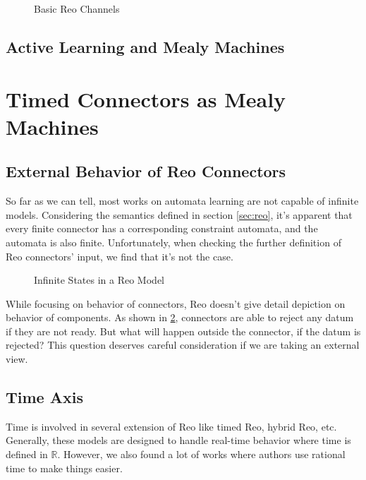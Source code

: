 \documentclass[conference, a4paper]{IEEEtran}
\begin{document}
\begin{figure}[h]
  \begin{center}
    
  \end{center}
  \caption{Basic Reo Channels}
  \label{fig:basic}
\end{figure}

\subsection{Active Learning and Mealy Machines}

\section{Timed Connectors as Mealy Machines}

\subsection{External Behavior of Reo Connectors}
So far as we can tell, most
works\cite{DBLP:conf/fase/RaffeltS06, DBLP:journals/corr/ChenHLLTWW15} on automata learning are not
capable of infinite models.  Considering the semantics defined in section
\ref{sec:reo}, it's apparent that every finite connector has a corresponding constraint
automata, and the automata is also finite. Unfortunately, when checking the further definition of
Reo connectors' input, we find that it's not the case.


\begin{figure}[h]
  \caption{Infinite States in a Reo Model}
  \label{fig:reoinfinite}
\end{figure}

While focusing on behavior of connectors, Reo doesn't give detail depiction on behavior of
components. As shown in \figurename \ref{fig:reoinfinite}, connectors are able to reject any datum
if they are not ready. But what will happen outside the connector, if the datum is rejected? This
question deserves careful consideration if we are taking an external view.

\subsection{Time Axis}
Time is involved in several extension of Reo like timed Reo, hybrid Reo, etc.
Generally, these models are designed to handle real-time behavior where time is defined in
$\mathbb{R}$. However, we also found a lot of works where authors use rational time to make things
easier.
\end{document}
